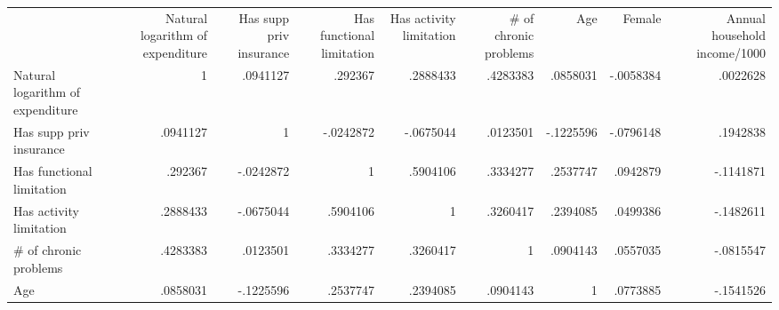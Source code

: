 \documentclass{article}
\begin{document}
\begin{table}[!h]
\centering
\begin{tabular}{lllllllll}
\cline{1-9}
\multicolumn{1}{c}{} &
  \multicolumn{1}{|r}{Natural logarithm of expenditure} &
  \multicolumn{1}{r}{Has supp priv insurance} &
  \multicolumn{1}{r}{Has functional limitation} &
  \multicolumn{1}{r}{Has activity limitation} &
  \multicolumn{1}{r}{\# of chronic problems} &
  \multicolumn{1}{r}{Age} &
  \multicolumn{1}{r}{Female} &
  \multicolumn{1}{r}{Annual household income/1000} \\
\cline{1-9}
\multicolumn{1}{l}{Natural logarithm of expenditure} &
  \multicolumn{1}{|r}{1} &
  \multicolumn{1}{r}{.0941127} &
  \multicolumn{1}{r}{.292367} &
  \multicolumn{1}{r}{.2888433} &
  \multicolumn{1}{r}{.4283383} &
  \multicolumn{1}{r}{.0858031} &
  \multicolumn{1}{r}{-.0058384} &
  \multicolumn{1}{r}{.0022628} \\
\multicolumn{1}{l}{Has supp priv insurance} &
  \multicolumn{1}{|r}{.0941127} &
  \multicolumn{1}{r}{1} &
  \multicolumn{1}{r}{-.0242872} &
  \multicolumn{1}{r}{-.0675044} &
  \multicolumn{1}{r}{.0123501} &
  \multicolumn{1}{r}{-.1225596} &
  \multicolumn{1}{r}{-.0796148} &
  \multicolumn{1}{r}{.1942838} \\
\multicolumn{1}{l}{Has functional limitation} &
  \multicolumn{1}{|r}{.292367} &
  \multicolumn{1}{r}{-.0242872} &
  \multicolumn{1}{r}{1} &
  \multicolumn{1}{r}{.5904106} &
  \multicolumn{1}{r}{.3334277} &
  \multicolumn{1}{r}{.2537747} &
  \multicolumn{1}{r}{.0942879} &
  \multicolumn{1}{r}{-.1141871} \\
\multicolumn{1}{l}{Has activity limitation} &
  \multicolumn{1}{|r}{.2888433} &
  \multicolumn{1}{r}{-.0675044} &
  \multicolumn{1}{r}{.5904106} &
  \multicolumn{1}{r}{1} &
  \multicolumn{1}{r}{.3260417} &
  \multicolumn{1}{r}{.2394085} &
  \multicolumn{1}{r}{.0499386} &
  \multicolumn{1}{r}{-.1482611} \\
\multicolumn{1}{l}{\# of chronic problems} &
  \multicolumn{1}{|r}{.4283383} &
  \multicolumn{1}{r}{.0123501} &
  \multicolumn{1}{r}{.3334277} &
  \multicolumn{1}{r}{.3260417} &
  \multicolumn{1}{r}{1} &
  \multicolumn{1}{r}{.0904143} &
  \multicolumn{1}{r}{.0557035} &
  \multicolumn{1}{r}{-.0815547} \\
\multicolumn{1}{l}{Age} &
  \multicolumn{1}{|r}{.0858031} &
  \multicolumn{1}{r}{-.1225596} &
  \multicolumn{1}{r}{.2537747} &
  \multicolumn{1}{r}{.2394085} &
  \multicolumn{1}{r}{.0904143} &
  \multicolumn{1}{r}{1} &
  \multicolumn{1}{r}{.0773885} &
  \multicolumn{1}{r}{-.1541526} \\

\end{tabular}
\end{table}
\end{document}
